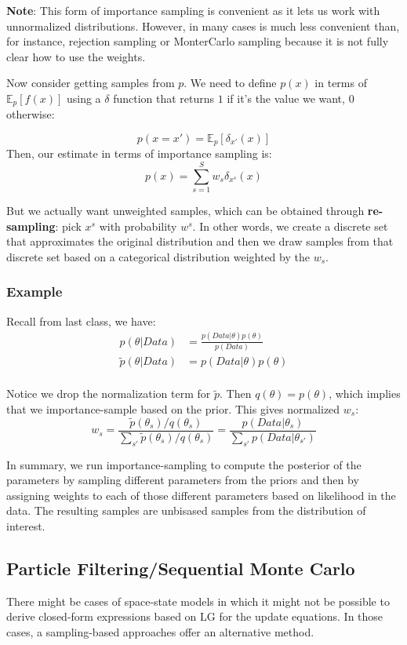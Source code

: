 \documentclass{article}
\begin{document}
\textbf{Note}: This form of importance sampling is convenient as it lets us work with unnormalized distributions. However, in many cases is much less convenient than, for instance, rejection sampling or MonterCarlo sampling because it is not fully clear how to use the weights. 


Now consider getting samples from $p$. We need to define $p(x)$ in terms of $\mathbb{E}_p[f(x)]$ using a $\delta$ function that returns $1$ if it's the value we want, $0$ otherwise:

\[p(x=x') = \mathbb{E}_p[\delta_{x'}(x)]\]
Then, our estimate in terms of importance sampling is:
\[p(x) = \sum_{s=1}^S w_s \delta_{x^s}(x)\]

But we actually want unweighted samples, which can be obtained through \textbf{re-sampling}: pick $x^s$ with probability $w^s$. In other words, we create a discrete set that approximates the original distribution and then we draw samples from that discrete set based on a categorical distribution weighted by the $w_s$. 

\subsubsection{Example} Recall from last class, we have:
\begin{align*}
    p(\theta | Data) &= \frac{p(Data|\theta)p(\theta)}{p(Data)} \\
    \tilde{p}(\theta | Data) &= p(Data|\theta)p(\theta) \\
\end{align*}

Notice we drop the normalization term for $\tilde{p}$. Then $q(\theta) = p(\theta)$, which implies that we importance-sample based on the prior. This gives normalized $w_s$:
\[
w_s = \frac{\tilde{p}(\theta_s)/{q}(\theta_s)}{\sum_{s'} \tilde{p}(\theta_s)/{q}(\theta_s)} =\frac{p(Data| \theta_s)}{\sum_{s'} p(Data|\theta_{s'}) }
\]

In summary, we run importance-sampling to compute the posterior of the parameters by sampling different parameters from the priors and then by assigning weights to each of those different parameters based on likelihood in the data. The resulting samples are unbisased samples from the distribution of interest. 


\subsection{Particle Filtering/Sequential Monte Carlo}
There might be cases of space-state models in which it might not be possible to derive closed-form expressions based on LG for the update equations. In those cases, a sampling-based approaches offer an alternative method. 
\end{document}
